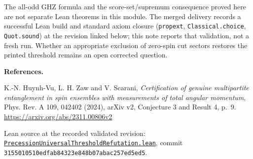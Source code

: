 \documentclass[11pt,a4paper]{article}
\begin{document}
The all-odd GHZ formula and the score-set/supremum consequence proved
here are not separate Lean theorems in this module. The merged delivery
records a successful Lean build and standard axiom closure
(\texttt{propext}, \texttt{Classical.choice}, \texttt{Quot.sound}) at the
revision linked below; this note reports that validation, not a fresh run.
Whether an appropriate exclusion of zero-spin cut sectors restores the
printed threshold remains an open corrected question.

\small
\textbf{References.}\par
[1] K.-N. Huynh-Vu, L. H. Zaw and V. Scarani,
\emph{Certification of genuine multipartite entanglement in spin ensembles
with measurements of total angular momentum}, Phys. Rev. A 109, 042402
(2024), arXiv v2, Conjecture 3 and Result 4, p.~9.
\url{https://arxiv.org/abs/2311.00806v2}\par
[2] Lean source at the recorded validated revision:
\href{https://github.com/the-omega-institute/trureturing/blob/3155010510edfab84323e848b07abac257ed5ed5/D5/S3/Quantum/Entanglement/PrecessionUniversalThresholdRefutation.lean}{\texttt{PrecessionUniversalThresholdRefutation.lean}},
commit \texttt{3155010510edfab84323e848b07abac257ed5ed5}.
\end{document}
